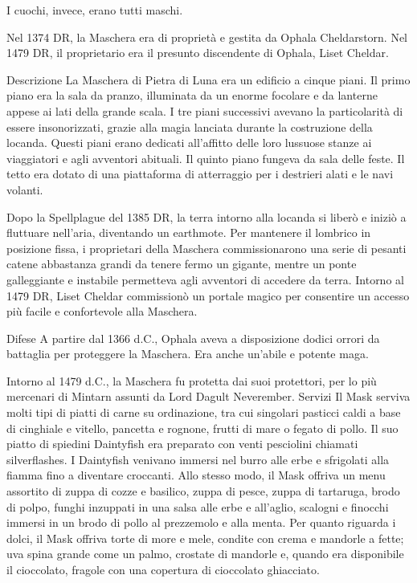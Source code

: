\documentclass{article}
\begin{document}
I cuochi, invece, erano tutti maschi.

Nel 1374 DR, la Maschera era di proprietà e gestita da Ophala Cheldarstorn. Nel 1479 DR, il proprietario era il presunto discendente di Ophala, Liset Cheldar.

Descrizione
La Maschera di Pietra di Luna era un edificio a cinque piani. Il primo piano era la sala da pranzo, illuminata da un enorme focolare e da lanterne appese ai lati della grande scala. I tre piani successivi avevano la particolarità di essere insonorizzati, grazie alla magia lanciata durante la costruzione della locanda. Questi piani erano dedicati all'affitto delle loro lussuose stanze ai viaggiatori e agli avventori abituali. Il quinto piano fungeva da sala delle feste. Il tetto era dotato di una piattaforma di atterraggio per i destrieri alati e le navi volanti.

Dopo la Spellplague del 1385 DR, la terra intorno alla locanda si liberò e iniziò a fluttuare nell'aria, diventando un earthmote. Per mantenere il lombrico in posizione fissa, i proprietari della Maschera commissionarono una serie di pesanti catene abbastanza grandi da tenere fermo un gigante, mentre un ponte galleggiante e instabile permetteva agli avventori di accedere da terra. Intorno al 1479 DR, Liset Cheldar commissionò un portale magico per consentire un accesso più facile e confortevole alla Maschera.

Difese
A partire dal 1366 d.C., Ophala aveva a disposizione dodici orrori da battaglia per proteggere la Maschera. Era anche un'abile e potente maga.

Intorno al 1479 d.C., la Maschera fu protetta dai suoi protettori, per lo più mercenari di Mintarn assunti da Lord Dagult Neverember.
Servizi\newline
Il Mask serviva molti tipi di piatti di carne su ordinazione, tra cui singolari pasticci caldi a base di cinghiale e vitello, pancetta e rognone, frutti di mare o fegato di pollo. Il suo piatto di spiedini Daintyfish era preparato con venti pesciolini chiamati silverflashes. I Daintyfish venivano immersi nel burro alle erbe e sfrigolati alla fiamma fino a diventare croccanti. Allo stesso modo, il Mask offriva un menu assortito di zuppa di cozze e basilico, zuppa di pesce, zuppa di tartaruga, brodo di polpo, funghi inzuppati in una salsa alle erbe e all'aglio, scalogni e finocchi immersi in un brodo di pollo al prezzemolo e alla menta. Per quanto riguarda i dolci, il Mask offriva torte di more e mele, condite con crema e mandorle a fette; uva spina grande come un palmo, crostate di mandorle e, quando era disponibile il cioccolato, fragole con una copertura di cioccolato ghiacciato.
\end{document}
